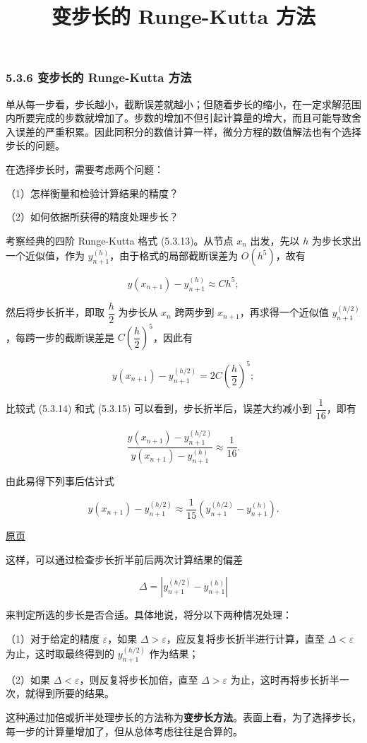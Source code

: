 \documentclass[
  10pt,
  fontset=fandol]{ctexart}
\title{变步长的 Runge-Kutta 方法}
\author{}
\date{}
\begin{document}
\maketitle

\subsubsection{5.3.6 变步长的 Runge-Kutta 方法}\label{ux53d8ux6b65ux957fux7684-runge-kutta-ux65b9ux6cd5}

单从每一步看，步长越小，截断误差就越小；但随着步长的缩小，在一定求解范围内所要完成的步数就增加了。步数的增加不但引起计算量的增大，而且可能导致舍入误差的严重积累。因此同积分的数值计算一样，微分方程的数值解法也有个选择步长的问题。

在选择步长时，需要考虑两个问题：

（1）怎样衡量和检验计算结果的精度？

（2）如何依据所获得的精度处理步长？

考察经典的四阶 Runge-Kutta 格式 (5.3.13)。从节点 \(x_n\) 出发，先以 \(h\) 为步长求出一个近似值，作为 \(y_{n+1}^{(h)}\)，由于格式的局部截断误差为 \(O(h^5)\)，故有

\[
y(x_{n+1})-y_{n+1}^{(h)}\approx Ch^5;\tag{5.3.14}
\]

然后将步长折半，即取 \(\dfrac{h}{2}\) 为步长从 \(x_n\) 跨两步到 \(x_{n+1}\)，再求得一个近似值 \(y_{n+1}^{(h/2)}\)，每跨一步的截断误差是 \(C\left(\dfrac{h}{2}\right)^5\)，因此有

\[
y(x_{n+1})-y_{n+1}^{(h/2)}=2C\left(\frac{h}{2}\right)^5;\tag{5.3.15}
\]

比较式 (5.3.14) 和式 (5.3.15) 可以看到，步长折半后，误差大约减小到 \(\dfrac{1}{16}\)，即有

\[
\frac{y(x_{n+1})-y_{n+1}^{(h/2)}}{y(x_{n+1})-y_{n+1}^{(h)}}\approx\frac{1}{16}.
\]

由此易得下列事后估计式

\[
y(x_{n+1})-y_{n+1}^{(h/2)}\approx\frac{1}{15}(y_{n+1}^{(h/2)}-y_{n+1}^{(h)}).
\]

\href{../../source-images/pdf-133.jpeg}{原页}

这样，可以通过检查步长折半前后两次计算结果的偏差

\[
\Delta=|y_{n+1}^{(h/2)}-y_{n+1}^{(h)}|
\]

来判定所选的步长是否合适。具体地说，将分以下两种情况处理：

（1）对于给定的精度 \(\varepsilon\)，如果 \(\Delta>\varepsilon\)，应反复将步长折半进行计算，直至 \(\Delta<\varepsilon\) 为止，这时取最终得到的 \(y_{n+1}^{(h/2)}\) 作为结果；

（2）如果 \(\Delta<\varepsilon\)，则反复将步长加倍，直至 \(\Delta>\varepsilon\) 为止，这时再将步长折半一次，就得到所要的结果。

这种通过加倍或折半处理步长的方法称为\textbf{变步长方法}。表面上看，为了选择步长，每一步的计算量增加了，但从总体考虑往往是合算的。
\end{document}
